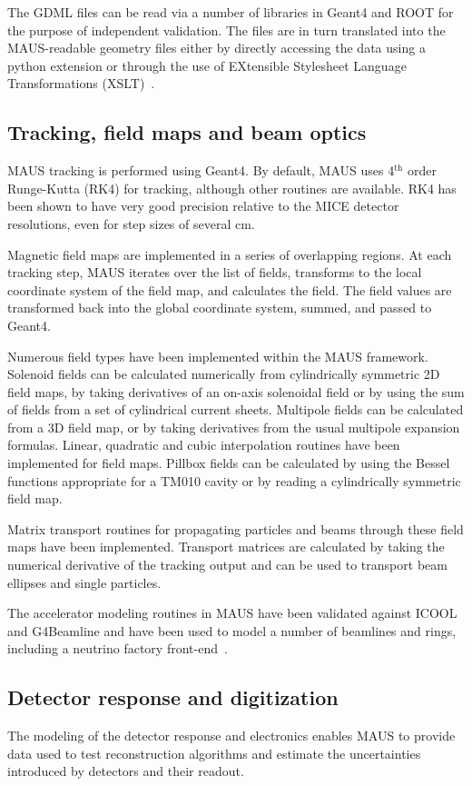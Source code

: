 \documentclass[11pt]{article}
\begin{document}
The GDML files can be read via a
number of  libraries in Geant4 and ROOT for the
purpose of independent validation. The files are in turn translated into the MAUS-readable
geometry files either by directly accessing the data using a python
extension or through the use of EXtensible Stylesheet Language Transformations
(XSLT)~\cite{xslt}.

\subsection{Tracking, field maps and beam optics}\label{sec:fieldoptics}
MAUS tracking is performed using Geant4. By default, MAUS uses 4$^\mathrm{th}$ order Runge-Kutta (RK4) for tracking, although other routines are available. RK4 has been shown to have very good precision relative to the MICE detector resolutions, even for step sizes of several cm.

Magnetic field maps are implemented in a series of overlapping regions. At each tracking step, MAUS iterates over the list of fields, transforms to the local coordinate system of the field map, and calculates the field. The field values are transformed back into the global coordinate system, summed, and passed to Geant4. 

Numerous field types have been implemented within the MAUS framework. Solenoid fields can be calculated numerically from cylindrically symmetric 2D field maps, by taking derivatives of an on-axis solenoidal field or by using the sum of fields from a set of cylindrical current sheets. Multipole fields can be calculated from a 3D field map, or by taking derivatives from the usual multipole expansion formulas. Linear, quadratic and cubic interpolation routines have been implemented for field maps. Pillbox fields can be calculated by using the Bessel functions appropriate for a TM010 cavity or by reading a cylindrically symmetric field map.

Matrix transport routines for propagating particles and beams through these field maps have been implemented. Transport matrices are calculated by taking the numerical derivative of the tracking output and can be used to transport beam ellipses and single particles.

The accelerator modeling routines in MAUS have been validated against ICOOL and G4Beamline and have been used to model a number of beamlines and rings, including a neutrino factory front-end~\cite{MAUSNuFact}.

\subsection{Detector response and digitization}\label{sec:detresp}
The modeling of the detector response and electronics enables MAUS to provide  data used to test reconstruction algorithms and estimate the uncertainties introduced by detectors and their readout.
\end{document}
